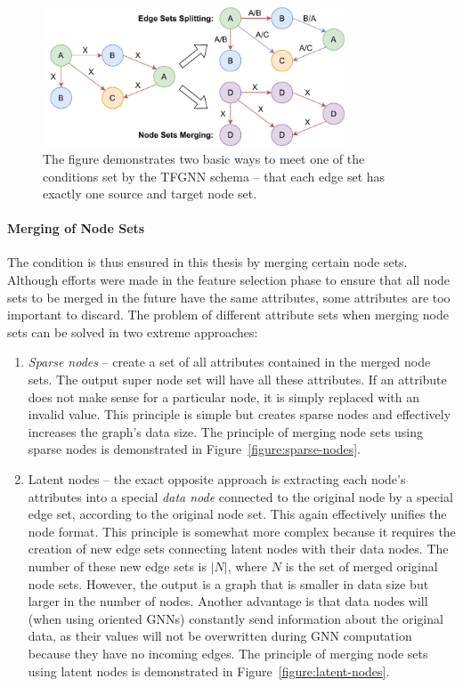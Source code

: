 \begin{figure}[t]
	\centering
	\includegraphics[width=0.8\textwidth]{figures/tfgnn-condition.pdf}
	\caption{The figure demonstrates two basic ways to meet one of the conditions set by the TFGNN schema -- that each edge set has exactly one source and target node set.}
	\label{figure:tfgnn-condition}
\end{figure}

\paragraph{Merging of Node Sets}
The condition is thus ensured in this thesis by merging certain node sets. Although efforts were made in the feature selection phase to ensure that all node sets to be merged in the future have the same attributes, some attributes are too important to discard. The problem of different attribute sets when merging node sets can be solved in two extreme approaches:
\begin{enumerate}
    \item \textit{Sparse nodes} -- create a set of all attributes contained in the merged node sets. The output super node set will have all these attributes. If an attribute does not make sense for a particular node, it is simply replaced with an invalid value. This principle is simple but creates sparse nodes and effectively increases the graph's data size. The principle of merging node sets using sparse nodes is demonstrated in Figure~\ref{figure:sparse-nodes}.
    
    \item Latent nodes -- the exact opposite approach is extracting each node's attributes into a special \textit{data node} connected to the original node by a special edge set, according to the original node set. This again effectively unifies the node format. This principle is somewhat more complex because it requires the creation of new edge sets connecting latent nodes with their data nodes. The number of these new edge sets is $|N|$, where $N$ is the set of merged original node sets. However, the output is a graph that is smaller in data size but larger in the number of nodes. Another advantage is that data nodes will (when using oriented GNNs) constantly send information about the original data, as their values will not be overwritten during GNN computation because they have no incoming edges. The principle of merging node sets using latent nodes is demonstrated in Figure~\ref{figure:latent-nodes}.
\end{enumerate}

